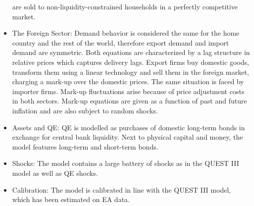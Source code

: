 \documentclass[11pt,a4paper]{article}
\begin{document}
\begin{itemize}
		are sold to non-liquidity-constrained households in a perfectly competitive market.
		\item The Foreign Sector:  Demand behavior is considered the same for the home country and the rest of the world, therefore export demand and import demand are symmetric. Both equations are characterized by a lag structure in relative prices which captures delivery lags. Export firms buy domestic goods, transform them using a linear technology and sell them in the foreign market, charging a mark-up over the domestic prices. The same situation is faced by importer firms. Mark-up fluctuations arise because of price adjustment costs in both sectors. Mark-up equations are given as a function of past and future inflation and are also subject to random shocks.
		\item Assets and QE: QE is modelled as purchases of domestic long-term bonds in exchange for central bank liquidity. Next to physical capital and money, the model features long-term and short-term bonds.
		\item Shocks: The model contains a large battery of shocks as in the QUEST III model as well as QE shocks.
		\item Calibration: The model is calibrated in line with the QUEST III model, which has been estimated on EA data. \end{itemize}
	
	
\end{document}
